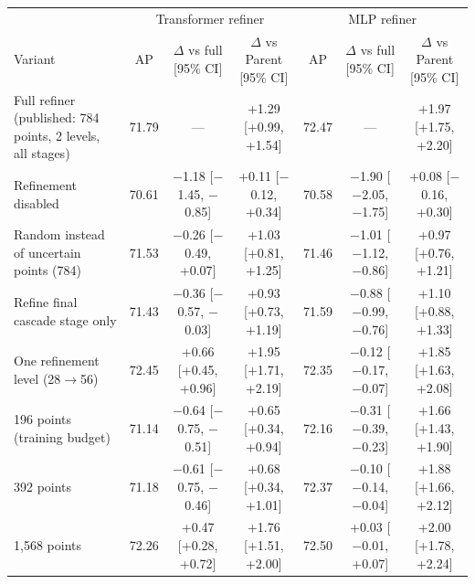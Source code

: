 \begin{tabular}{lcccccc}\toprule
 & \multicolumn{3}{c}{Transformer refiner} & \multicolumn{3}{c}{MLP refiner}\\
Variant & AP & $\Delta$ vs full [95\% CI] & $\Delta$ vs Parent [95\% CI] & AP & $\Delta$ vs full [95\% CI] & $\Delta$ vs Parent [95\% CI]\\\midrule
Full refiner (published: 784 points, 2 levels, all stages) & 71.79 & — & +1.29 [+0.99, +1.54] & 72.47 & — & +1.97 [+1.75, +2.20]\\
Refinement disabled & 70.61 & $-$1.18 [$-$1.45, $-$0.85] & +0.11 [$-$0.12, +0.34] & 70.58 & $-$1.90 [$-$2.05, $-$1.75] & +0.08 [$-$0.16, +0.30]\\
Random instead of uncertain points (784) & 71.53 & $-$0.26 [$-$0.49, +0.07] & +1.03 [+0.81, +1.25] & 71.46 & $-$1.01 [$-$1.12, $-$0.86] & +0.97 [+0.76, +1.21]\\
Refine final cascade stage only & 71.43 & $-$0.36 [$-$0.57, $-$0.03] & +0.93 [+0.73, +1.19] & 71.59 & $-$0.88 [$-$0.99, $-$0.76] & +1.10 [+0.88, +1.33]\\
One refinement level (28$\to$56) & 72.45 & +0.66 [+0.45, +0.96] & +1.95 [+1.71, +2.19] & 72.35 & $-$0.12 [$-$0.17, $-$0.07] & +1.85 [+1.63, +2.08]\\
196 points (training budget) & 71.14 & $-$0.64 [$-$0.75, $-$0.51] & +0.65 [+0.34, +0.94] & 72.16 & $-$0.31 [$-$0.39, $-$0.23] & +1.66 [+1.43, +1.90]\\
392 points & 71.18 & $-$0.61 [$-$0.75, $-$0.46] & +0.68 [+0.34, +1.01] & 72.37 & $-$0.10 [$-$0.14, $-$0.04] & +1.88 [+1.66, +2.12]\\
1{,}568 points & 72.26 & +0.47 [+0.28, +0.72] & +1.76 [+1.51, +2.00] & 72.50 & +0.03 [$-$0.01, +0.07] & +2.00 [+1.78, +2.24]\\
\bottomrule\end{tabular}
